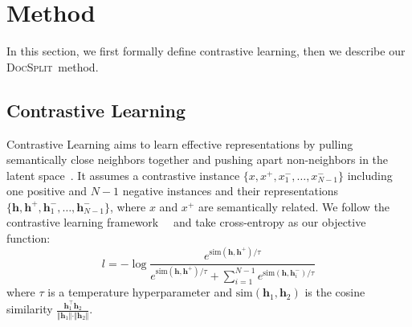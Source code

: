 \documentclass[11pt]{article}
\newcommand{\our}{\mbox{\textsc{DocSplit}}}
\begin{document}

\section{Method}

\label{sec:method}
In this section, we first formally define contrastive learning, then we describe our \our~method.

%
%

\subsection{Contrastive Learning}
Contrastive Learning aims to learn effective representations by pulling semantically close neighbors together and pushing apart non-neighbors in the latent space~\cite{Hadsell2006DimensionalityRB}.
It assumes a contrastive instance $\{x, x^{+}, x_1^{-},\dots,x_{N-1}^{-}\}$ including one positive and $N-1$ negative instances and their representations $\{\mathbf{h}, \mathbf{h}^{+}, \mathbf{h}_1^{-}, \dots,
\mathbf{h}_{N-1}^{-}\}$, where $x$ and $x^{+}$ are semantically related.
We follow the contrastive learning framework~~\cite{Chen2020ASF, Li2022UCTopicUC} and take cross-entropy as our objective function:
\begin{equation}
\label{cl}
    l = -\log \frac{e^{\mathrm{sim}(\mathbf{h}, \mathbf{h}^{+})/\tau}}{e^{\mathrm{sim}(\mathbf{h}, \mathbf{h}^{+})/\tau}+ \sum_{i=1}^{N-1}e^{\mathrm{sim}(\mathbf{h}, \mathbf{h}_i^{-})/\tau}}
\end{equation}
where $\tau$ is a temperature hyperparameter and $\mathrm{sim}(\mathbf{h}_1, \mathbf{h}_2)$ is the cosine similarity $\frac{\mathbf{h}_1^{\top}\mathbf{h}_2}{\Vert \mathbf{h}_1 \Vert \cdot \Vert \mathbf{h}_2 \Vert}$.
\end{document}
